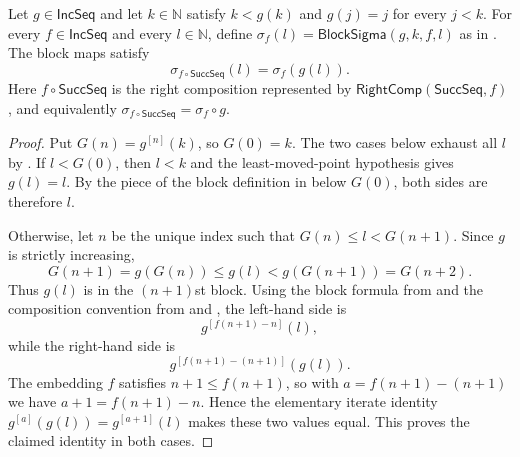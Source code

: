 \begin{lemma}
Let $g\in\mathsf{IncSeq}$ and let $k\in\mathbb N$ satisfy
$k<g(k)$ and $g(j)=j$ for every $j<k$.  For every
$f\in\mathsf{IncSeq}$ and every $l\in\mathbb N$, define
$\sigma_f(l)=\mathsf{BlockSigma}(g,k,f,l)$ as in
.  The block maps satisfy
\[
\sigma_{f\circ\mathsf{SuccSeq}}(l)=\sigma_f(g(l)).
\]
Here $f\circ\mathsf{SuccSeq}$ is the right composition represented by
$\mathsf{RightComp}(\mathsf{SuccSeq},f)$, and equivalently
$\sigma_{f\circ\mathsf{SuccSeq}}=\sigma_f\circ g$.
\end{lemma}
\begin{proof}
Put $G(n)=g^{[n]}(k)$, so $G(0)=k$.  The two cases below exhaust all
$l$ by .  If $l<G(0)$, then $l<k$ and the
least-moved-point hypothesis gives $g(l)=l$.  By the piece of the block
definition in  below $G(0)$, both sides are therefore
$l$.

Otherwise, let $n$ be the unique index such that
$G(n)\leq l<G(n+1)$.  Since $g$ is strictly increasing,
\[
G(n+1)=g(G(n))\leq g(l)<g(G(n+1))=G(n+2).
\]
Thus $g(l)$ is in the $(n+1)$st block.  Using the block formula from
 and the composition convention from
 and , the left-hand side is
\[
g^{[f(n+1)-n]}(l),
\]
while the right-hand side is
\[
g^{[f(n+1)-(n+1)]}(g(l)).
\]
The embedding $f$ satisfies $n+1\leq f(n+1)$, so with
$a=f(n+1)-(n+1)$ we have $a+1=f(n+1)-n$.  Hence the elementary iterate
identity $g^{[a]}(g(l))=g^{[a+1]}(l)$ makes these two values equal.  This
proves the claimed identity in both cases.
\end{proof}
